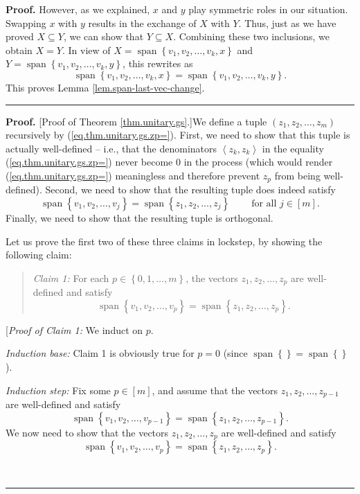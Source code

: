 \documentclass[numbers=enddot,12pt,final,onecolumn,notitlepage]{scrartcl}%
\numberwithin{exer}{subsection}
\theoremstyle{definition}
\newenvironment{statement}{\begin{quote}}{\end{quote}}
\newenvironment{proof}[1][Proof]{\noindent\textbf{#1.} }{\ \rule{0.5em}{0.5em}}
\begin{document}
\begin{proof}
However, as we explained, $x$ and $y$ play symmetric roles in our situation.
Swapping $x$ with $y$ results in the exchange of $X$ with $Y$. Thus, just as
we have proved $X\subseteq Y$, we can show that $Y\subseteq X$. Combining
these two inclusions, we obtain $X=Y$. In view of $X=\operatorname*{span}%
\left\{  v_{1},v_{2},\ldots,v_{k},x\right\}  $ and $Y=\operatorname*{span}%
\left\{  v_{1},v_{2},\ldots,v_{k},y\right\}  $, this rewrites as%
\[
\operatorname*{span}\left\{  v_{1},v_{2},\ldots,v_{k},x\right\}
=\operatorname*{span}\left\{  v_{1},v_{2},\ldots,v_{k},y\right\}  .
\]
This proves Lemma \ref{lem.span-last-vec-change}.
\end{proof}

\begin{proof}
[Proof of Theorem \ref{thm.unitary.gs}.]We define a tuple $\left(  z_{1}%
,z_{2},\ldots,z_{m}\right)  $ recursively by (\ref{eq.thm.unitary.gs.zp=}).
First, we need to show that this tuple is actually well-defined -- i.e., that
the denominators $\left\langle z_{k},z_{k}\right\rangle $ in the equality
(\ref{eq.thm.unitary.gs.zp=}) never become $0$ in the process (which would
render (\ref{eq.thm.unitary.gs.zp=}) meaningless and therefore prevent $z_{p}$
from being well-defined). Second, we need to show that the resulting tuple
does indeed satisfy
\[
\operatorname*{span}\left\{  v_{1},v_{2},\ldots,v_{j}\right\}
=\operatorname*{span}\left\{  z_{1},z_{2},\ldots,z_{j}\right\}
\ \ \ \ \ \ \ \ \ \ \text{for all }j\in\left[  m\right]  .
\]
Finally, we need to show that the resulting tuple is orthogonal.

Let us prove the first two of these three claims in lockstep, by showing the
following claim:

\begin{statement}
\textit{Claim 1:} For each $p\in\left\{  0,1,\ldots,m\right\}  $, the vectors
$z_{1},z_{2},\ldots,z_{p}$ are well-defined and satisfy%
\[
\operatorname*{span}\left\{  v_{1},v_{2},\ldots,v_{p}\right\}
=\operatorname*{span}\left\{  z_{1},z_{2},\ldots,z_{p}\right\}  .
\]

\end{statement}

[\textit{Proof of Claim 1:} We induct on $p$.

\textit{Induction base:} Claim 1 is obviously true for $p=0$ (since
$\operatorname*{span}\left\{  {}\right\}  =\operatorname*{span}\left\{
{}\right\}  $).

\textit{Induction step:} Fix some $p\in\left[  m\right]  $, and assume that
the vectors $z_{1},z_{2},\ldots,z_{p-1}$ are well-defined and satisfy
\begin{equation}
\operatorname*{span}\left\{  v_{1},v_{2},\ldots,v_{p-1}\right\}
=\operatorname*{span}\left\{  z_{1},z_{2},\ldots,z_{p-1}\right\}  .
\label{pf.thm.unitary.gs.6}%
\end{equation}
We now need to show that the vectors $z_{1},z_{2},\ldots,z_{p}$ are
well-defined and satisfy%
\begin{equation}
\operatorname*{span}\left\{  v_{1},v_{2},\ldots,v_{p}\right\}
=\operatorname*{span}\left\{  z_{1},z_{2},\ldots,z_{p}\right\}  .
\label{pf.thm.unitary.gs.5}%
\end{equation}



\end{proof}
\end{document}
